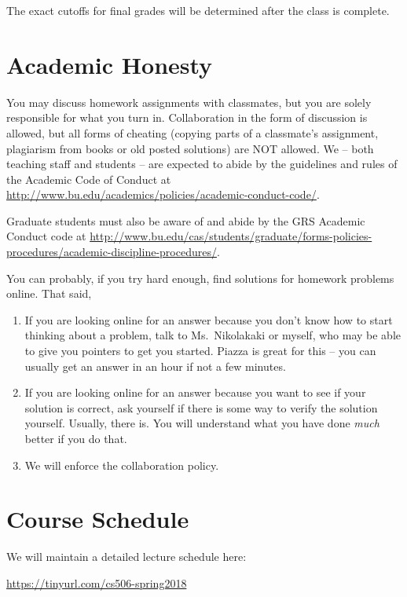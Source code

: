 \documentclass[11pt]{article}
\begin{document}
The exact cutoffs for final grades will be determined after the class is
complete.



\section*{Academic Honesty}

You may discuss homework assignments with classmates, but you are 
solely responsible for what you turn in. Collaboration in the form of
discussion is allowed, but all forms of cheating (copying parts of a
classmate's assignment, plagiarism from books or old posted solutions)
are NOT allowed. We -- both teaching staff and students -- are expected
to abide by the guidelines and rules of the Academic Code of Conduct
at
\url{http://www.bu.edu/academics/policies/academic-conduct-code/}.

Graduate students must also be aware of and abide by the GRS Academic
Conduct code at \url{http://www.bu.edu/cas/students/graduate/forms-policies-procedures/academic-discipline-procedures/}.

You can probably, if you try hard enough, find solutions for homework
problems online. That said,
\begin{enumerate}
\item If you are looking online for an answer because you don't know how
  to start thinking about a problem, talk to Ms.\ Nikolakaki or myself, who may be
  able to give you pointers to get you started.  Piazza is great for
  this -- you can usually get an answer in an hour if not a few minutes.
\item If you are looking online for an answer because you want to see if
  your solution is correct, ask yourself if there is some way to verify
  the solution yourself.   Usually, there is.  You will understand what you have done
  \emph{much} better if you do that.
\item We will enforce the collaboration policy.
\end{enumerate}

\newpage
\section*{Course Schedule}

We will maintain a detailed lecture schedule here: 

\url{https://tinyurl.com/cs506-spring2018}
\end{document}
